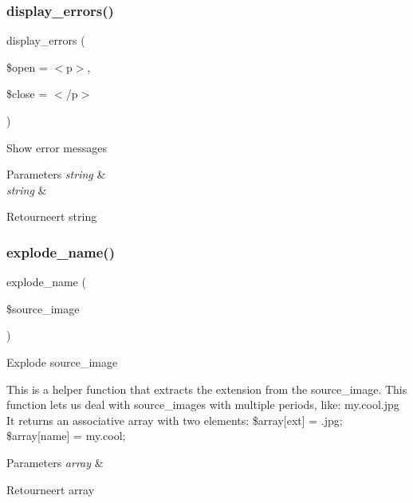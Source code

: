\subsubsection{\texorpdfstring{display\_errors()}{display\_errors()}}
{\footnotesize\ttfamily display\+\_\+errors (\begin{DoxyParamCaption}\item[{}]{\$open = {\ttfamily \textquotesingle{}$<$p$>$\textquotesingle{}},  }\item[{}]{\$close = {\ttfamily \textquotesingle{}$<$/p$>$\textquotesingle{}} }\end{DoxyParamCaption})}

Show error messages


\begin{DoxyParams}{Parameters}
{\em string} & \\
\hline
{\em string} & \\
\hline
\end{DoxyParams}
\begin{DoxyReturn}{Retourneert}
string 
\end{DoxyReturn}
\mbox{\label{class_c_i___image__lib_a32661288e0bea18ea50fbb7be6535af5}} 
\subsubsection{\texorpdfstring{explode\_name()}{explode\_name()}}
{\footnotesize\ttfamily explode\+\_\+name (\begin{DoxyParamCaption}\item[{}]{\$source\+\_\+image }\end{DoxyParamCaption})}

Explode source\+\_\+image

This is a helper function that extracts the extension from the source\+\_\+image. This function lets us deal with source\+\_\+images with multiple periods, like\+: my.\+cool.\+jpg It returns an associative array with two elements\+: \$array\mbox{[}\textquotesingle{}ext\textquotesingle{}\mbox{]} = \textquotesingle{}.jpg\textquotesingle{}; \$array\mbox{[}\textquotesingle{}name\textquotesingle{}\mbox{]} = \textquotesingle{}my.\+cool\textquotesingle{};


\begin{DoxyParams}{Parameters}
{\em array} & \\
\hline
\end{DoxyParams}
\begin{DoxyReturn}{Retourneert}
array 
\end{DoxyReturn}
\mbox{\label{class_c_i___image__lib_a04376d5530f38a1a61f59c2d769284ba}} 
